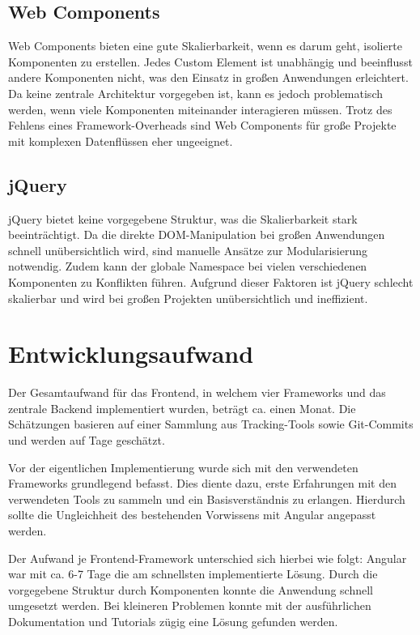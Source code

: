 \documentclass[oneside]{ausarbeitung}
\begin{document}
\subsection{Web Components}

Web Components bieten eine gute Skalierbarkeit, wenn es darum geht, isolierte Komponenten zu erstellen. Jedes Custom Element ist unabhängig und beeinflusst andere Komponenten nicht, was den Einsatz in großen Anwendungen erleichtert. Da keine zentrale Architektur vorgegeben ist, kann es jedoch problematisch werden, wenn viele Komponenten miteinander interagieren müssen. Trotz des Fehlens eines Framework-Overheads sind Web Components für große Projekte mit komplexen Datenflüssen eher ungeeignet.

\subsection{jQuery}

jQuery bietet keine vorgegebene Struktur, was die Skalierbarkeit stark beeinträchtigt. Da die direkte DOM-Manipulation bei großen Anwendungen schnell unübersichtlich wird, sind manuelle Ansätze zur Modularisierung notwendig. Zudem kann der globale Namespace bei vielen verschiedenen Komponenten zu Konflikten führen. Aufgrund dieser Faktoren ist jQuery schlecht skalierbar und wird bei großen Projekten unübersichtlich und ineffizient.

\section{Entwicklungsaufwand}

Der Gesamtaufwand für das Frontend, in welchem vier Frameworks und das zentrale Backend implementiert wurden, beträgt ca. einen Monat. Die Schätzungen basieren auf einer Sammlung aus Tracking-Tools sowie Git-Commits und werden auf Tage geschätzt.

Vor der eigentlichen Implementierung wurde sich mit den verwendeten Frameworks grundlegend befasst. Dies diente dazu, erste Erfahrungen mit den verwendeten Tools zu sammeln und ein Basisverständnis zu erlangen. Hierdurch sollte die Ungleichheit des bestehenden Vorwissens mit Angular angepasst werden.

Der Aufwand je Frontend-Framework unterschied sich hierbei wie folgt: Angular war mit ca. 6-7 Tage die am schnellsten implementierte Lösung. Durch die vorgegebene Struktur durch Komponenten konnte die Anwendung schnell umgesetzt werden. Bei kleineren Problemen konnte mit der ausführlichen Dokumentation und Tutorials zügig eine Lösung gefunden werden.
\end{document}
